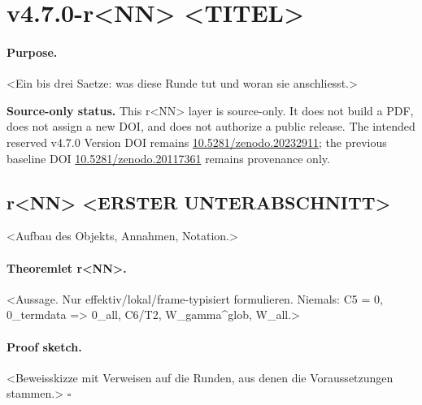 
\clearpage
\section*{v4.7.0-r<NN> <TITEL>}
\label{sec:r<NN>-<SLUG>}

\paragraph{Purpose.}
<Ein bis drei Saetze: was diese Runde tut und woran sie anschliesst.>

\noindent\textbf{Source-only status.}
This r<NN> layer is source-only.  It does not build a PDF, does not assign a new DOI,
and does not authorize a public release.  The intended reserved v4.7.0 Version DOI remains
\href{https://doi.org/10.5281/zenodo.20232911}{10.5281/zenodo.20232911}; the previous
baseline DOI \href{https://doi.org/10.5281/zenodo.20117361}{10.5281/zenodo.20117361}
remains provenance only.

\subsection*{r<NN> <ERSTER UNTERABSCHNITT>}
\label{subsec:r<NN>-<SLUG-1>}

<Aufbau des Objekts, Annahmen, Notation.>

\paragraph{Theoremlet r<NN>.}
<Aussage. Nur effektiv/lokal/frame-typisiert formulieren.
 Niemals: C5 = 0, 0_termdata => 0_all, C6/T2, W_gamma^glob, W_all.>

\paragraph{Proof sketch.}
<Beweisskizze mit Verweisen auf die Runden, aus denen die Voraussetzungen stammen.>
\(\square\)

